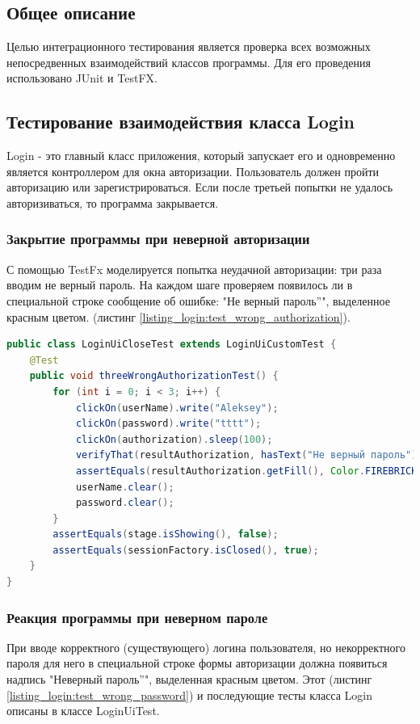 \documentclass[a4paper,12pt]{article}
\begin{document}
\subsection{Общее описание}
Целью интеграционного тестирования является проверка всех возможных непосредвенных взаимодействий классов программы. 
Для его проведения использовано JUnit и TestFX.

\newpage\subsection{Тестирование взаимодействия класса Login}
Login - это главный класс приложения, который запускает его и одновременно является контроллером для окна авторизации. Пользователь должен пройти авторизацию или зарегистрироваться. Если после третьей попытки не удалось авторизиваться, то программа закрывается.
\subsubsection{Закрытие программы при неверной авторизации}
С помощью TestFx моделируется попытка неудачной авторизации: три раза вводим не верный пароль. На каждом шаге проверяем появилось ли в специальной строке сообщение об ошибке: "Не верный пароль''", выделенное красным цветом. (листинг \ref{listing_login:test_wrong_authorization}).
\begin{lstlisting}[language=java, caption=Тестирование неверной авторизации, label=listing_login:test_wrong_authorization]
public class LoginUiCloseTest extends LoginUiCustomTest {
    @Test
    public void threeWrongAuthorizationTest() {
        for (int i = 0; i < 3; i++) {
            clickOn(userName).write("Aleksey");
            clickOn(password).write("tttt");
            clickOn(authorization).sleep(100);
            verifyThat(resultAuthorization, hasText("Не верный пароль"));
            assertEquals(resultAuthorization.getFill(), Color.FIREBRICK);
            userName.clear();
            password.clear();
        }
        assertEquals(stage.isShowing(), false);
        assertEquals(sessionFactory.isClosed(), true);
    }
}
\end{lstlisting}

\subsubsection{Реакция программы при неверном пароле}
При вводе корректного (существующего) логина пользователя, но некорректного пароля для него в специальной строке формы авторизации должна появиться надпись "Неверный пароль''", выделенная красным цветом. Этот (листинг \ref{listing_login:test_wrong_password}) и последующие тесты класса Login описаны в классе LoginUiTest.
\end{document}
